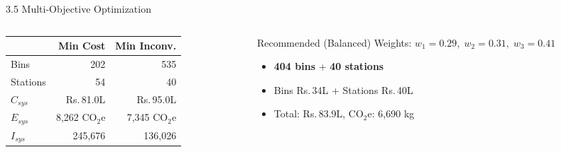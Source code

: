 \documentclass[aspectratio=169]{beamer}
\begin{document}
\begin{frame}{3.5 Multi-Objective Optimization}
    \normalsize
    \begin{columns}[T]
        \begin{column}{0.48\textwidth}
            \begin{table}
                \centering\footnotesize
                \begin{tabular}{l r r}
                    \toprule
                    & \textbf{Min Cost} & \textbf{Min Inconv.} \\ \midrule
                    Bins & 202 & 535 \\
                    Stations & 54 & 40 \\
                    $C_{sys}$ & Rs.\,81.0L & Rs.\,95.0L \\
                    $E_{sys}$ & 8{,}262 CO$_2$e & 7{,}345 CO$_2$e \\
                    $I_{sys}$ & 245{,}676 & 136{,}026 \\
                    \bottomrule
                \end{tabular}
            \end{table}
        \end{column}
        \begin{column}{0.48\textwidth}
            \begin{exampleblock}{Recommended (Balanced)}
                \small
                Weights: $w_1{=}0.29,\; w_2{=}0.31,\; w_3{=}0.41$
                \begin{itemize}\setlength\itemsep{0pt}
                    \item \textbf{404 bins} + \textbf{40 stations}
                    \item Bins Rs.\,34L + Stations Rs.\,40L
                    \item Total: Rs.\,83.9L, CO$_2$e: 6{,}690 kg
                \end{itemize}
            \end{exampleblock}
        \end{column}
    \end{columns}
\end{frame}
\end{document}
